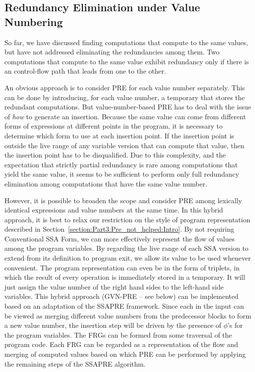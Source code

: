 \subsection{Redundancy Elimination under Value Numbering}
So far, we have discussed finding computations that compute to the same values, but have not addressed eliminating the redundancies among them. 
Two computations that compute to the same value exhibit redundancy only if there is an control-flow path that leads from one to the other.

An obvious approach is to consider PRE for each value number separately. 
This can be done by introducing, for each value number, a temporary that stores the redundant computations.
But value-number-based PRE has to deal with the issue of \emph{how} to generate an insertion. 
Because the same value can come from different forms of expressions at different points in the program, it is necessary to determine which form to use at each insertion point. 
If the insertion point is outside the live range of any variable version that can compute that value, then the insertion point has to be disqualified. 
Due to this complexity, and the expectation that strictly partial redundancy is rare among computations that yield the same value, it seems to be sufficient to perform only full redundancy elimination among computations that have the same value number.

However, it is possible to broaden the scope and consider PRE among lexically identical expressions and value numbers at the same time. 
In this hybrid approach, it is best to relax our restriction on the style of program representation described in Section~\ref{section:Part3:Pre_not_helped:Intro}. 
By not requiring Conventional SSA Form, we can more effectively represent the flow of values among the program variables. 
By regarding the live range of each SSA version to extend from its definition to program exit, we allow its value to be used whenever convenient. 
The program representation can even be in the form of triplets, in which the result of every operation is immediately stored in a temporary. 
It will just assign the value number of the right hand sides to the left-hand side variables.
This hybrid approach (GVN-PRE -- see below) can be implemented based on an adaptation of the SSAPRE framework. 
Since each \phifun in the input can be viewed as merging different value numbers from the predecessor blocks to form a new value number, the \PHIfun insertion step will be driven by the presence of $\phi$'s for the program variables. 
The FRGs can be formed from some traversal of the program code. 
Each FRG can be regarded as a representation of the flow and merging of computed values based on which PRE can be performed by applying the remaining steps of the SSAPRE algorithm.

